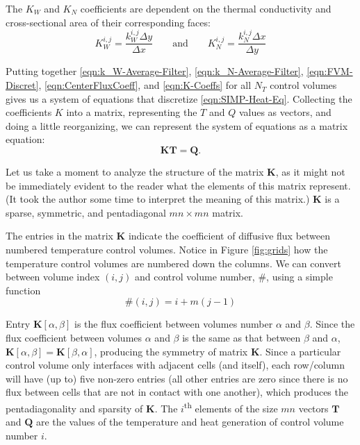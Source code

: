 The $K_W$ and $K_N$ coefficients are dependent on the thermal conductivity and cross-sectional area of their corresponding faces:
\begin{equation}
	K_W^{i,j}=\frac{k_W^{i,j}\Delta y}{\Delta x}\qquad\text{and}\qquad K_N^{i,j}=\frac{k_N^{i,j}\Delta x}{\Delta y}\label{eqn:K-Coeffs}
\end{equation}

Putting together \eqref{eqn:k_W-Average-Filter}, \eqref{eqn:k_N-Average-Filter}, \eqref{eqn:FVM-Discret}, \eqref{eqn:CenterFluxCoeff}, and \eqref{eqn:K-Coeffs} for all $N_T$ control volumes gives us a system of equations that discretize \eqref{eqn:SIMP-Heat-Eq}. Collecting the coefficients $K$ into a matrix, representing the $T$ and $Q$ values as vectors, and doing a little reorganizing, we can represent the system of equations as a matrix equation:
\begin{equation}
	\mathbf{K}\mathbf{T}=\mathbf{Q}.\label{eqn:KTQ-Matrix-Eqn}
\end{equation}

Let us take a moment to analyze the structure of the matrix $\mathbf{K}$, as it might not be immediately evident to the reader what the elements of this matrix represent. (It took the author some time to interpret the meaning of this matrix.) $\mathbf{K}$ is a sparse, symmetric, and pentadiagonal $mn\times mn$ matrix.

The entries in the matrix $\mathbf{K}$ indicate the coefficient of diffusive flux between numbered temperature control volumes. Notice in Figure \ref{fig:grids} how the temperature control volumes are numbered down the columns. We can convert between volume index $(i,j)$ and control volume number, $\#$, using a simple function
\begin{equation}
	\#(i,j)=i+m(j-1)\label{eqn:cord2num}
\end{equation}

Entry $\mathbf{K}[\alpha,\beta]$ is the flux coefficient between volumes number $\alpha$ and $\beta$. Since the flux coefficient between volumes $\alpha$ and $\beta$ is the same as that between $\beta$ and $\alpha$, $\mathbf{K}[\alpha,\beta]=\mathbf{K}[\beta,\alpha]$, producing the symmetry of matrix $\mathbf{K}$. Since a particular control volume only interfaces with adjacent cells (and itself), each row/column will have (up to) five non-zero entries (all other entries are zero since there is no flux between cells that are not in contact with one another), which produces the pentadiagonality and sparsity of $\mathbf{K}$. The $i$\textsuperscript{th} elements of the size $mn$ vectors $\mathbf{T}$ and $\mathbf{Q}$ are the values of the temperature and heat generation of control volume number $i$.

